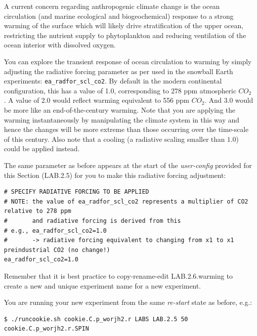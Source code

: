 A current concern regarding anthropogenic climate change is the ocean circulation (and marine ecological and biogeochemical) response to a strong warming of the surface which will likely drive stratification of the upper ocean, restricting the nutrient supply to phytoplankton and reducing ventilation of the ocean interior with dissolved oxygen.

\vspace{1mm}
You can explore the transient response of ocean circulation to warming by simply adjusting the radiative forcing parameter as per used in the snowball Earth experiments: \texttt{ea\_radfor\_scl\_co2}. By default in the modern continental configuration, this has a value of 1.0, corresponding to 278 ppm atmospheric \(CO_{2}\). A value of 2.0 would reflect warming equivalent to 556 ppm \(CO_{2}\). And 3.0 would be more like an end-of-the-century warming. Note that you are applying the warming instantaneously by manipulating the climate system in this way and hence the changes will be more extreme than those occurring over the time-scale of this century. Also note that a cooling (a radiative scaling smaller than $1.0$) could be applied instead.

\vspace{1mm}
The same parameter as before appears at the start of the \textit{user-config} provided for this Section (\textsf{\footnotesize LAB.2.5}) for you to make this radiative forcing adjustment:

\vspace{-2mm}\footnotesize\begin{verbatim}
# SPECIFY RADIATIVE FORCING TO BE APPLIED
# NOTE: the value of ea_radfor_scl_co2 represents a multiplier of CO2 relative to 278 ppm 
#       and radiative forcing is derived from this
# e.g., ea_radfor_scl_co2=1.0
#       -> radiative forcing equivalent to changing from x1 to x1 preindustrial CO2 (no change!)
ea_radfor_scl_co2=1.0
\end{verbatim}\normalsize\vspace{-2mm}

Remember that it is best practice to copy-rename-edit \textsf{\footnotesize LAB.2.6.warming} to create a new and unique experiment name for a new experiment.

\vspace{1mm}
You are running your new experiment from the same \textit{re-start} state as before, e.g.:

\vspace{-2mm}\small\begin{verbatim}
$ ./runcookie.sh cookie.C.p_worjh2.r LABS LAB.2.5 50 cookie.C.p_worjh2.r.SPIN
\end{verbatim}\normalsize\vspace{-2mm}

